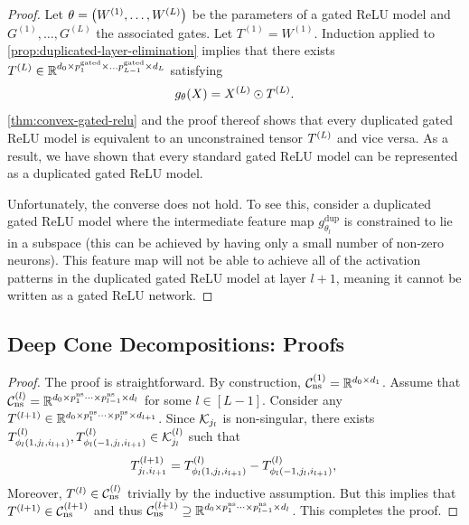 \duplicatedEquivalence*
\begin{proof}
    Let \( \theta = \left(W^{(1)}, \ldots, W^{(L)}\right) \)
    be the parameters of a gated ReLU model and \( G^{(1)}, \ldots, G^{(L)} \)
    the associated gates.
    Let \( T^{(1)} = W^{(1)} \).
    Induction applied to \cref{prop:duplicated-layer-elimination} implies
    that there exists
    \( T^{(L)} \in \mathbb{R}^{d_0 \times p_1^\text{gated} \times \ldots p_{L-1}^{\text{gated}} \times d_L} \)
    satisfying
    \[
        g_\theta(X) = X^{(L)} \odot T^{(L)}.
    \]
    \cref{thm:convex-gated-relu} and the proof thereof shows that every
    duplicated gated ReLU model is equivalent to an unconstrained tensor
    \( T^{(L)} \) and vice versa.
    As a result, we have shown that every standard gated ReLU model can be
    represented as a duplicated gated ReLU model.

    Unfortunately, the converse does not hold.
    To see this, consider a duplicated gated ReLU model where the intermediate
    feature map \( g_{\theta_{l}}^{\text{dup}} \) is constrained to lie in a
    subspace (this can be achieved by having only a small number of non-zero
    neurons).
    This feature map will not be able to achieve all of the activation patterns
    in the duplicated gated ReLU model at layer \( l+1 \),
    meaning it cannot be written as a gated ReLU network.
\end{proof}

\subsection{Deep Cone Decompositions: Proofs}\label{app:deep-cone-decompositions}

\deepNonSingularCones*
\begin{proof}
    The proof is straightforward.
    By construction, \( \mathcal{C}_{\text{ns}}^{(1)} = \mathbb{R}^{d_0 \times d_1} \).
    Assume that
    \( \mathcal{C}^{(l)}_{\text{ns}} = \mathbb{R}^{d_0 \times p^\text{ns}_1 \cdots \times p^\text{ns}_{l-1} \times d_{l}} \)
    for some \( l \in [L-1] \).
    Consider any \( T^{(l+1)} \in \mathbb{R}^{d_0 \times p^\text{ns}_1 \cdots \times p^\text{ns}_{l} \times d_{l+1}} \).
    Since \( \mathcal{K}_{j_l} \) is non-singular, there exists
    \( T^{(l)}_{\phi_l(1, j_l, i_{l+1})}, T^{(l)}_{ \phi_l(-1, j_l, i_{l+1})}
    \in \mathcal{K}^{(l)}_{j_{l}} \) such that
    \[
        T^{(l+1)}_{j_{l}, i_{l+1}}
        = T^{(l)}_{ \phi_l(1, j_l, i_{l+1})}
        - T^{(l)}_{ \phi_l(-1, j_l, i_{l+1})}, \\
    \]
    Moreover,
    \( T^{(l)} \in \mathcal{C}^{(l)}_{\text{ns}} \) trivially by the inductive assumption.
    But this implies that \( T^{(l+1)} \in \mathcal{C}^{(l+1)}_{\text{ns}} \) and thus
    \( \mathcal{C}^{(l+1)}_{\text{ns}} \supseteq \mathbb{R}^{d_0 \times p^\text{ns}_1 \cdots \times p^\text{ns}_{l-1} \times d_{l}} \).
    This completes the proof.
\end{proof}

